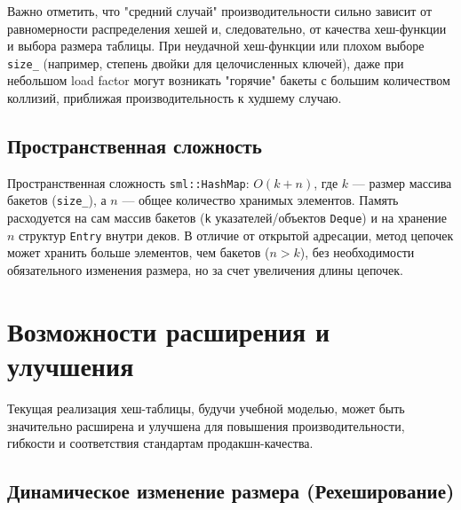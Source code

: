 \documentclass[a4paper,12pt]{article}
\begin{document}
Важно отметить, что "средний случай" производительности сильно зависит от равномерности распределения хешей и, следовательно, от качества хеш-функции и выбора размера таблицы. При неудачной хеш-функции или плохом выборе \texttt{size\_} (например, степень двойки для целочисленных ключей), даже при небольшом load factor могут возникать "горячие" бакеты с большим количеством коллизий, приближая производительность к худшему случаю.

\subsection{Пространственная сложность}

Пространственная сложность \texttt{sml::HashMap}: \(O(k + n)\), где \(k\) --- размер массива бакетов (\texttt{size\_}), а \(n\) --- общее количество хранимых элементов. Память расходуется на сам массив бакетов (\texttt{k} указателей/объектов \texttt{Deque}) и на хранение \(n\) структур \texttt{Entry} внутри деков. В отличие от открытой адресации, метод цепочек может хранить больше элементов, чем бакетов (\(n > k\)), без необходимости обязательного изменения размера, но за счет увеличения длины цепочек.

\section{Возможности расширения и улучшения}

Текущая реализация хеш-таблицы, будучи учебной моделью, может быть значительно расширена и улучшена для повышения производительности, гибкости и соответствия стандартам продакшн-качества.

\subsection{Динамическое изменение размера (Рехеширование)}
\end{document}
